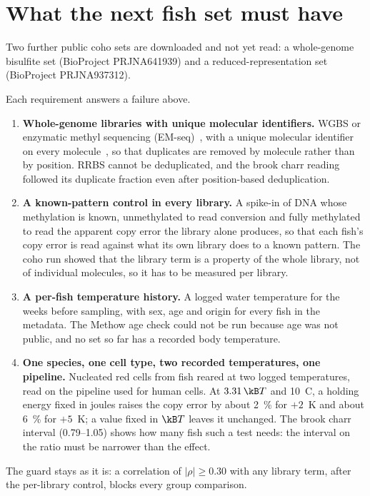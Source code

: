 \section{What the next fish set must have}

Two further public coho sets are downloaded and not yet read: a whole-genome bisulfite set (BioProject PRJNA641939) and a
reduced-representation set (BioProject PRJNA937312). \openprob

Each requirement answers a failure above.
\begin{enumerate}
\item \textbf{Whole-genome libraries with unique molecular identifiers.} WGBS or enzymatic methyl sequencing
      (EM-seq)~\cite{Vaisvila2021}, with a unique molecular identifier on every molecule~\cite{Kivioja2012}, so that duplicates are
      removed by molecule rather than by position. RRBS cannot be deduplicated, and the brook charr reading followed its duplicate
      fraction even after position-based deduplication.
\item \textbf{A known-pattern control in every library.} A spike-in of DNA whose methylation is known, unmethylated to read
      conversion and fully methylated to read the apparent copy error the library alone produces, so that each fish's copy error
      is read against what its own library does to a known pattern. The coho run showed that the library term is a property of the
      whole library, not of individual molecules, so it has to be measured per library.
\item \textbf{A per-fish temperature history.} A logged water temperature for the weeks before sampling, with sex, age and origin
      for every fish in the metadata. The Methow age check could not be run because age was not public, and no set so far has a
      recorded body temperature.
\item \textbf{One species, one cell type, two recorded temperatures, one pipeline.} Nucleated red cells from fish reared at two
      logged temperatures, read on the pipeline used for human cells. At $3.31\,\kB T$ and 10~\textdegree C, a holding energy fixed
      in joules raises the copy error by about 2~\% for $+2$~K and about 6~\% for $+5$~K; a value fixed in $\kB T$ leaves it
      unchanged. \calc{} The brook charr interval (0.79--1.05) shows how many fish such a test needs: the interval on the ratio must
      be narrower than the effect.
\end{enumerate}
The guard stays as it is: a correlation of $|\rho|\ge0.30$ with any library term, after the per-library control, blocks every
group comparison.

